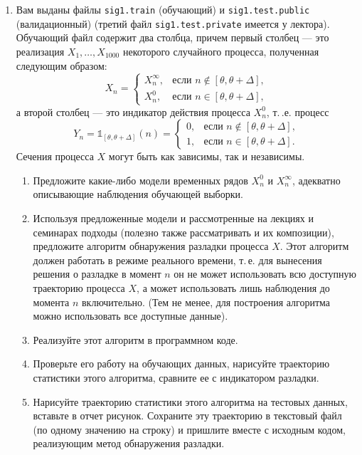 \documentclass[a4paper,14pt]{extreport}
\renewcommand{\=}[1]{\stackrel{#1}{=}} %
\begin{document}
\begin{enumerate}
    \item Вам выданы файлы \texttt{sig1.train}
    (обучающий) и \texttt{sig1.test.public}
    (валидационный) (третий файл
    \texttt{sig1.test.private} имеется у лектора). 
    Обучающий файл содержит два столбца, причем
    первый столбец --- это реализация 
    $X_1, \ldots, X_{1000}$ некоторого
    случайного процесса, полученная следующим
    образом:
    \[
    X_n = 
    \begin{cases}
        X^{\infty}_n, & \text{если } n \notin [\theta, \theta + \Delta], \\
        X^{0}_n, & \text{если } n \in [\theta, \theta + \Delta],
    \end{cases}
    \]
    а второй столбец --- это индикатор действия
    процесса $X^{0}_n$, т.\,.е. процесс
    \[
    Y_n = \mathds{1}_{[\theta, \theta + \Delta]}(n) = 
    \begin{cases}
        0, & \text{если } n \notin [\theta, \theta + \Delta], \\
        1, & \text{если } n \in [\theta, \theta + \Delta].
    \end{cases}
    \]
    Сечения процесса $X$ могут быть как зависимы,
    так и независимы.

    \begin{enumerate}
        \item Предложите какие-либо
        модели временных рядов
        $X^{0}_n$ и $X^{\infty}_n$, 
        адекватно описывающие наблюдения
        обучающей выборки.

        \item Используя предложенные модели
        и рассмотренные на лекциях и семинарах
        подходы (полезно также рассматривать
        и их композиции), 
        предложите алгоритм обнаружения разладки
        процесса $X$. Этот алгоритм должен работать
        в режиме реального времени, т.\,е. для вынесения
        решения о разладке в момент $n$
        он не может использовать 
        всю доступную траекторию процесса
        $X$, а может использовать  лишь наблюдения
        до момента $n$ включительно.
        (Тем не менее, для построения алгоритма
        можно использовать все доступные данные).

        \item Реализуйте этот алгоритм в программном коде.

        \item Проверьте его работу на обучающих данных,
        нарисуйте траекторию статистики этого алгоритма,
        сравните ее с индикатором разладки.

        \item Нарисуйте траекторию статистики этого алгоритма на тестовых данных, вставьте
        в отчет рисунок. Сохраните эту траекторию
        в текстовый файл (по одному значению на строку)
        и пришлите вместе с исходным кодом,
        реализующим метод обнаружения разладки.
    \end{enumerate}

\end{enumerate}
\end{document}
